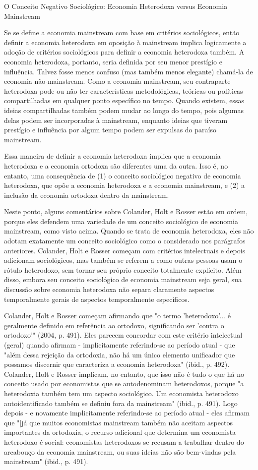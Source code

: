 \documentclass[a4paper,12pt]{article}[abntex2]
\begin{document}
O Conceito Negativo Sociológico: Economia Heterodoxa versus Economia Mainstream

Se se define a economia mainstream com base em critérios sociológicos, então definir a economia heterodoxa em oposição à mainstream implica logicamente a adoção de critérios sociológicos para definir a economia heterodoxa também. A economia heterodoxa, portanto, seria definida por seu menor prestígio e influência. Talvez fosse menos confuso (mas também menos elegante) chamá-la de economia não-mainstream. Como a economia mainstream, seu contraparte heterodoxa pode ou não ter características metodológicas, teóricas ou políticas compartilhadas em qualquer ponto específico no tempo. Quando existem, essas ideias compartilhadas também podem mudar ao longo do tempo, pois algumas delas podem ser incorporadas à mainstream, enquanto ideias que tiveram prestígio e influência por algum tempo podem ser expulsas do paraíso mainstream.

Essa maneira de definir a economia heterodoxa implica que a economia heterodoxa e a economia ortodoxa são diferentes uma da outra. Isso é, no entanto, uma consequência de (1) o conceito sociológico negativo de economia heterodoxa, que opõe a economia heterodoxa e a economia mainstream, e (2) a inclusão da economia ortodoxa dentro da mainstream.

Neste ponto, alguns comentários sobre Colander, Holt e Rosser estão em ordem, porque eles defendem uma variedade de um conceito sociológico de economia mainstream, como visto acima. Quando se trata de economia heterodoxa, eles não adotam exatamente um conceito sociológico como o considerado nos parágrafos anteriores. Colander, Holt e Rosser começam com critérios intelectuais e depois adicionam sociológicos, mas também se referem a como outras pessoas usam o rótulo heterodoxo, sem tornar seu próprio conceito totalmente explícito. Além disso, embora seu conceito sociológico de economia mainstream seja geral, sua discussão sobre economia heterodoxa não separa claramente aspectos temporalmente gerais de aspectos temporalmente específicos.

Colander, Holt e Rosser começam afirmando que "o termo 'heterodoxo'... é geralmente definido em referência ao ortodoxo, significando ser 'contra o ortodoxo'" (2004, p. 491). Eles parecem concordar com este critério intelectual (geral) quando afirmam - implicitamente referindo-se ao período atual - que "além dessa rejeição da ortodoxia, não há um único elemento unificador que possamos discernir que caracteriza a economia heterodoxa" (ibid., p. 492). Colander, Holt e Rosser implicam, no entanto, que isso não é tudo o que há no conceito usado por economistas que se autodenominam heterodoxos, porque "a heterodoxia também tem um aspecto sociológico. Um economista heterodoxo autoidentificado também se definiu fora da mainstream" (ibid., p. 491). Logo depois - e novamente implicitamente referindo-se ao período atual - eles afirmam que "[já que muitos economistas mainstream também não aceitam aspectos importantes da ortodoxia, o recurso adicional que determina um economista heterodoxo é social: economistas heterodoxos se recusam a trabalhar dentro do arcabouço da economia mainstream, ou suas ideias não são bem-vindas pela mainstream" (ibid., p. 491).
\end{document}
